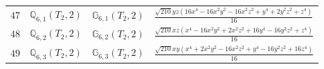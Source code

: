 \documentclass[fleqn,8pt,landscape]{jsarticle}
\begin{document}
\begin{table}[ht!]
\begin{center}
\begin{tabular}{cccl}
$ 47 $ & $ \mathbb{Q}_{6,1}(T_{2},2) $ & $ \mathbb{G}_{6,1}(T_{2},2) $ & $ \frac{\sqrt{210} y z \left(16 x^{4} - 16 x^{2} y^{2} - 16 x^{2} z^{2} + y^{4} + 2 y^{2} z^{2} + z^{4}\right)}{16} $ \\
$ 48 $ & $ \mathbb{Q}_{6,2}(T_{2},2) $ & $ \mathbb{G}_{6,2}(T_{2},2) $ & $ \frac{\sqrt{210} x z \left(x^{4} - 16 x^{2} y^{2} + 2 x^{2} z^{2} + 16 y^{4} - 16 y^{2} z^{2} + z^{4}\right)}{16} $ \\
$ 49 $ & $ \mathbb{Q}_{6,3}(T_{2},2) $ & $ \mathbb{G}_{6,3}(T_{2},2) $ & $ \frac{\sqrt{210} x y \left(x^{4} + 2 x^{2} y^{2} - 16 x^{2} z^{2} + y^{4} - 16 y^{2} z^{2} + 16 z^{4}\right)}{16} $ \\
 \hline \hline
\end{tabular}
\end{center}
\end{table}
\end{document}

